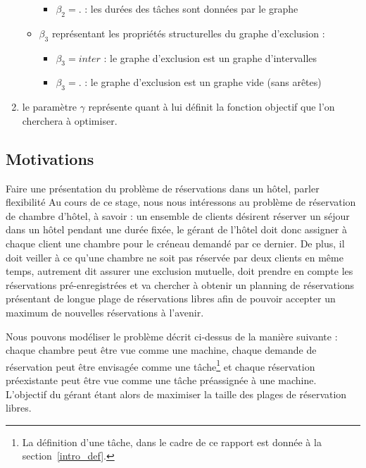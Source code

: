 \begin{enumerate}
\begin{itemize}[label=$\bullet$]
\begin{itemize}
                    \item $\beta_2 = .$ : les durées des tâches sont données par le graphe
                \end{itemize}
            \item $\beta_3$ représentant les propriétés structurelles du graphe d'exclusion :
                \begin{itemize}
                    \item $\beta_3 = inter$ : le graphe d'exclusion est un graphe d'intervalles
                    \item $\beta_3 = .$ : le graphe d'exclusion est un graphe vide (sans arêtes)
                \end{itemize}
        \end{itemize}
    \item le paramètre $\gamma$ représente quant à lui définit la fonction objectif que l'on
        cherchera à optimiser.
\end{enumerate}

\subsection{Motivations}

Faire une présentation du problème de réservations dans un hôtel, parler flexibilité
Au cours de ce stage, nous nous intéressons au problème de réservation de chambre d'hôtel, à savoir : un
ensemble de clients désirent réserver un séjour dans un hôtel pendant une durée fixée, le gérant de
l'hôtel doit donc assigner à chaque client une chambre pour le créneau demandé par ce dernier. De
plus, il doit veiller à ce qu'une chambre ne soit pas réservée par deux clients en même temps,
autrement dit assurer une exclusion mutuelle, doit
prendre en compte les réservations pré-enregistrées et va chercher à obtenir un planning de
réservations présentant de longue plage de réservations libres afin de pouvoir accepter un maximum
de nouvelles réservations à l'avenir.

Nous pouvons modéliser le problème décrit ci-dessus de la manière suivante : chaque
chambre peut être vue comme une machine, chaque demande de réservation peut être envisagée comme une
tâche\footnote{La définition d'une tâche, dans le cadre de ce rapport est donnée à la
section~\ref{intro_def}.} et chaque réservation préexistante peut être vue comme une tâche
préassignée à une machine. L'objectif du gérant étant alors de maximiser la taille des plages de
réservation libres.


